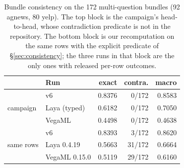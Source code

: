 \begin{table}[t]
\centering
\small
\caption{Bundle consistency on the 172 multi-question bundles (92 agnews,
80 yelp). The top block is the campaign's head-to-head, whose contradiction
predicate is not in the repository. The bottom block is our recomputation on
the same rows with the explicit predicate of \S\ref{sec:consistency}; the three
runs in that block are the only ones with released per-row outcomes.}
\label{tab:consistency}
\begin{tabular}{llrrr}
\toprule
 & Run & exact & contra. & macro \\
\midrule
\multirow{3}{*}{campaign} & v6 & 0.8376 & 0/172 & 0.8583 \\
 & Laya (typed) & 0.6182 & 0/172 & 0.7050 \\
 & VegaML & 0.4498 & 0/172 & 0.4638 \\
\midrule
\multirow{3}{*}{same rows} & v6 & 0.8393 & 3/172 & 0.8620 \\
 & Laya 0.4.19 & 0.5663 & 31/172 & 0.6664 \\
 & VegaML 0.15.0 & 0.5119 & 29/172 & 0.6160 \\
\bottomrule
\end{tabular}
\end{table}
